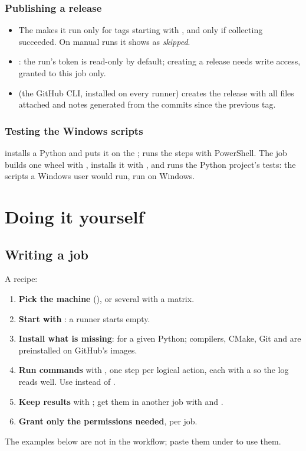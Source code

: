 \subsubsection{Publishing a release}
\begin{itemize}
  \item The  makes it run only for tags starting with , and only if collecting
        succeeded. On manual runs it shows as \emph{skipped}.
  \item {}: the run's token is read-only by default; creating a
        release needs write access, granted to this job only.
  \item {} (the GitHub CLI, installed on every runner) creates the release with all files
        attached and notes generated from the commits since the previous tag.
\end{itemize}

\subsubsection{Testing the Windows scripts}
 installs a Python and puts it on the ;
 runs the steps with PowerShell. The job builds one wheel with
, installs it with , and runs the Python project's
tests: the scripts a Windows user would run, run on Windows.

\section{Doing it yourself}

\subsection{Writing a job}
A recipe:
\begin{enumerate}
  \item \textbf{Pick the machine} (), or several with a matrix.
  \item \textbf{Start with }: a runner starts empty.
  \item \textbf{Install what is missing}:  for a given Python; compilers,
        CMake, Git and  are preinstalled on GitHub's images.
  \item \textbf{Run commands} with , one step per logical action, each with a
         so the log reads well. Use  instead of .
  \item \textbf{Keep results} with ; get them in another job with
         and .
  \item \textbf{Grant only the permissions needed}, per job.
\end{enumerate}
The examples below are not in the workflow; paste them under  to use them.


